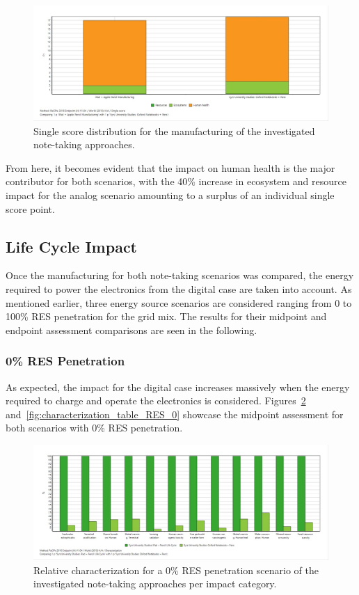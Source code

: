 \begin{figure}[H]
    \centering
    \includegraphics[width=\textwidth]{images/Manufacturing/Single_Score_Manufacturing.JPG}
    \caption{Single score distribution for the manufacturing of the investigated note-taking approaches.}\label{fig:single_score_manufacturing}
\end{figure}

From here, it becomes evident that the impact on human health is the major contributor for both scenarios, with the 40\% increase in ecosystem and resource impact for the analog scenario amounting to a surplus of an individual single score point. 

\subsection{Life Cycle Impact}\label{subsec:results_life_cycle}
Once the manufacturing for both note-taking scenarios was compared, the energy required to power the electronics from the digital case are taken into account. As mentioned earlier, three energy source scenarios are considered ranging from 0 to 100\% RES penetration for the grid mix. The results for their midpoint and endpoint assessment comparisons are seen in the following.

\subsubsection{0\% RES Penetration}
As expected, the impact for the digital case increases massively when the energy required to charge and operate the electronics is considered. Figures~\ref{fig:characterization_RES_0} and~\ref{fig:characterization_table_RES_0} showcase the midpoint assessment for both scenarios with 0\% RES penetration.

\begin{figure}[H]
    \centering
    \includegraphics[width=\textwidth]{images/RES_0/Characterization_RES_0.JPG}
    \caption{Relative characterization for a 0\% RES penetration scenario of the investigated note-taking approaches per impact category.}\label{fig:characterization_RES_0}
\end{figure}

